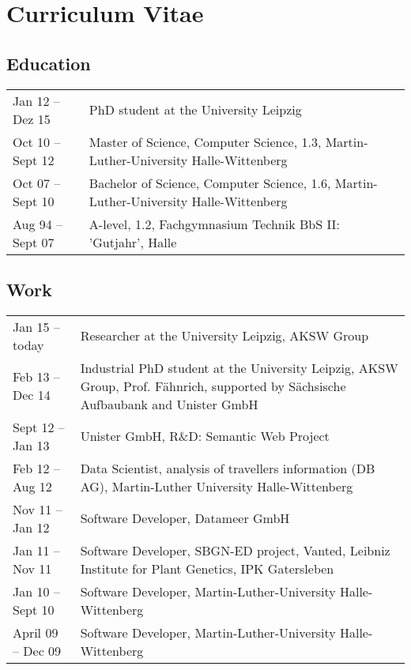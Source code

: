 \chapter*{Curriculum Vitae}

\section*{Education}
\begin{tabular}{p{3cm}p{10cm}}	
Jan 12 – Dez 15 		&  	PhD student at the University Leipzig\\
Oct 10 – Sept 12		&  	Master of Science, Computer Science, 1.3, Martin-Luther-University Halle-Wittenberg\\
Oct 07 – Sept 10		&  	Bachelor of Science, Computer Science, 1.6, Martin-Luther-University Halle-Wittenberg\\
Aug 94 – Sept 07		&  	A-level, 1.2, Fachgymnasium Technik BbS II: 'Gutjahr', Halle\\
\end{tabular}

\section*{Work}
\begin{tabular}{p{3cm}p{10cm}}	
Jan 15 – today      & Researcher at the University Leipzig, AKSW Group \\
Feb 13 – Dec 14     & Industrial PhD student at the University Leipzig, AKSW Group, Prof. Fähnrich, supported by Sächsische Aufbaubank and Unister GmbH\\
Sept 12 – Jan 13    & Unister GmbH, R\&D: Semantic Web Project\\
Feb 12 – Aug 12	    & Data Scientist, analysis of travellers information (DB AG), Martin-Luther University Halle-Wittenberg\\
Nov 11 – Jan 12	    & Software Developer, Datameer GmbH\\
Jan 11 – Nov 11	    & Software Developer, SBGN-ED project, Vanted, Leibniz Institute for Plant Genetics, IPK Gatersleben\\
Jan 10 – Sept 10	& Software Developer, Martin-Luther-University Halle-Wittenberg\\
April 09 – Dec 09	& Software Developer, Martin-Luther-University Halle-Wittenberg\\
\end{tabular}

